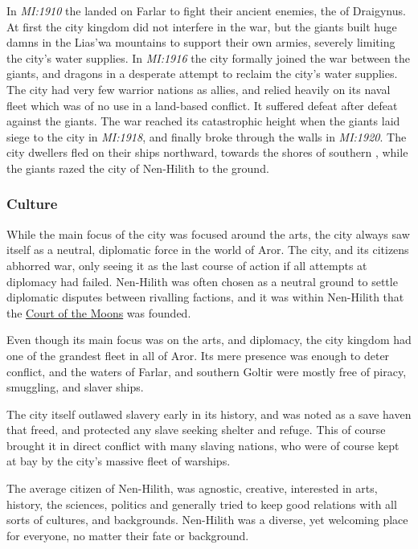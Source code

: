 In \emph{MI:1910} the  landed on Farlar to fight their
ancient enemies, the  of Draigynus. At first the city
kingdom did not interfere in the war, but the giants built huge damns in
the Lias'wa mountains to support their own armies, severely limiting the
city's water supplies. In \emph{MI:1916} the city formally joined the war
between the giants, and dragons in a desperate attempt to reclaim the city's
water supplies. The city had very few warrior nations as allies, and
relied heavily on its naval fleet which was of no use in a land-based
conflict. It suffered defeat after defeat against the giants. The war reached
its catastrophic height when the giants laid siege to the city in
\emph{MI:1918}, and finally broke through the walls in \emph{MI:1920}. The
city dwellers fled on their ships northward, towards the shores of southern
, while the giants razed the city of Nen-Hilith to the
ground.

\subsubsection{Culture}

While the main focus of the city was focused around the arts, the city always
saw itself as a neutral, diplomatic force in the world of Aror. The city, and
its citizens abhorred war, only seeing it as the last course of action if all
attempts at diplomacy had failed. Nen-Hilith was often chosen as a neutral
ground to settle diplomatic disputes between rivalling factions, and it was
within Nen-Hilith that the \hyperref[sec:Two Courts]{Court of the Moons} was
founded.

Even though its main focus was on the arts, and diplomacy, the city kingdom
had one of the grandest fleet in all of Aror. Its mere presence was enough to
deter conflict, and the waters of Farlar, and southern Goltir were mostly free
of piracy, smuggling, and slaver ships.

The city itself outlawed slavery early in its history, and was noted as a save
haven that freed, and protected any slave seeking shelter and refuge. This of
course brought it in direct conflict with many slaving nations, who were of
course kept at bay by the city's massive fleet of warships.

The average citizen of Nen-Hilith, was agnostic, creative, interested in arts,
history, the sciences, politics and generally tried to keep good relations with
all sorts of cultures, and backgrounds. Nen-Hilith was a diverse, yet welcoming
place for everyone, no matter their fate or background.

